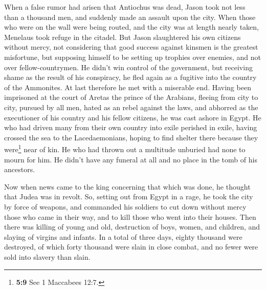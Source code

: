  When a false rumor had arisen that Antiochus was dead,
Jason took not less than a thousand men, and suddenly made an assault
upon the city. When those who were on the wall were being routed, and
the city was at length nearly taken, Menelaus took refuge in the
citadel.  But Jason slaughtered his own citizens without
mercy, not considering that good success against kinsmen is the greatest
misfortune, but supposing himself to be setting up trophies over
enemies, and not over fellow-countrymen.  He didn't win
control of the government, but receiving shame as the result of his
conspiracy, he fled again as a fugitive into the country of the
Ammonites.  At last therefore he met with a miserable end.
Having been imprisoned at the court of Aretas the prince of the
Arabians, fleeing from city to city, pursued by all men, hated as an
rebel against the laws, and abhorred as the executioner of his country
and his fellow citizens, he was cast ashore in Egypt.  He
who had driven many from their own country into exile perished in exile,
having crossed the sea to the Lacedaemonians, hoping to find shelter
there because they were\footnote{\textbf{5:9} See 1 Maccabees 12:7.}
near of kin.  He who had thrown out a multitude unburied
had none to mourn for him. He didn't have any funeral at all and no
place in the tomb of his ancestors.

 Now when news came to the king concerning that which was
done, he thought that Judea was in revolt. So, setting out from Egypt in
a rage, he took the city by force of weapons,  and
commanded his soldiers to cut down without mercy those who came in their
way, and to kill those who went into their houses.  Then
there was killing of young and old, destruction of boys, women, and
children, and slaying of virgins and infants.  In a total
of three days, eighty thousand were destroyed, of which forty thousand
were slain in close combat, and no fewer were sold into slavery than
slain.


